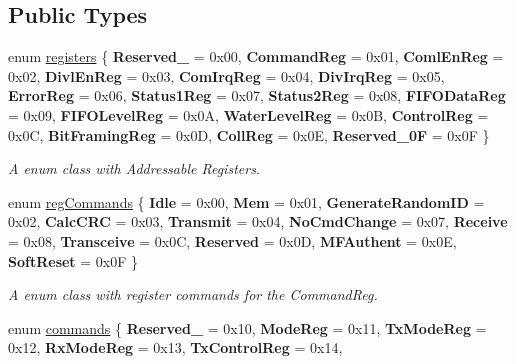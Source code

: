 \subsection*{Public Types}
\begin{DoxyCompactItemize}
\item 
enum \hyperlink{classrc522_a83057db5f8fefa3dc9a6e8e5f0e191ee}{registers} \{ \newline
{\bfseries Reserved\+\_} = 0x00, 
{\bfseries Command\+Reg} = 0x01, 
{\bfseries Coml\+En\+Reg} = 0x02, 
{\bfseries Divl\+En\+Reg} = 0x03, 
\newline
{\bfseries Com\+Irq\+Reg} = 0x04, 
{\bfseries Div\+Irq\+Reg} = 0x05, 
{\bfseries Error\+Reg} = 0x06, 
{\bfseries Status1\+Reg} = 0x07, 
\newline
{\bfseries Status2\+Reg} = 0x08, 
{\bfseries F\+I\+F\+O\+Data\+Reg} = 0x09, 
{\bfseries F\+I\+F\+O\+Level\+Reg} = 0x0A, 
{\bfseries Water\+Level\+Reg} = 0x0B, 
\newline
{\bfseries Control\+Reg} = 0x0C, 
{\bfseries Bit\+Framing\+Reg} = 0x0D, 
{\bfseries Coll\+Reg} = 0x0E, 
{\bfseries Reserved\+\_\+0F} = 0x0F
 \}\begin{DoxyCompactList}\small\item\em A enum class with Addressable Registers. \end{DoxyCompactList}
\item 
enum \hyperlink{classrc522_a3a205976fb9b7265bc5b7971215fbb7c}{reg\+Commands} \{ \newline
{\bfseries Idle} = 0x00, 
{\bfseries Mem} = 0x01, 
{\bfseries Generate\+Random\+ID} = 0x02, 
{\bfseries Calc\+C\+RC} = 0x03, 
\newline
{\bfseries Transmit} = 0x04, 
{\bfseries No\+Cmd\+Change} = 0x07, 
{\bfseries Receive} = 0x08, 
{\bfseries Transceive} = 0x0C, 
\newline
{\bfseries Reserved} = 0x0D, 
{\bfseries M\+F\+Authent} = 0x0E, 
{\bfseries Soft\+Reset} = 0x0F
 \}\begin{DoxyCompactList}\small\item\em A enum class with register commands for the Command\+Reg. \end{DoxyCompactList}
\item 
enum \hyperlink{classrc522_a6df2359c88d6c2f47faf58bc9e09eaa4}{commands} \{ \newline
{\bfseries Reserved\+\_} = 0x10, 
{\bfseries Mode\+Reg} = 0x11, 
{\bfseries Tx\+Mode\+Reg} = 0x12, 
{\bfseries Rx\+Mode\+Reg} = 0x13, 
\newline
{\bfseries Tx\+Control\+Reg} = 0x14, 

\end{DoxyCompactItemize}
